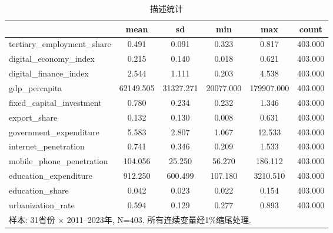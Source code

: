 \begin{table}[htbp]\centering
\def\sym#1{\ifmmode^{#1}\else\(^{#1}\)\fi}
\caption{描述统计}
\begin{tabular}{l*{1}{ccccc}}
\hline\hline
            &        mean&          sd&         min&         max&       count\\
\hline
tertiary\_employment\_share&       0.491&       0.091&       0.323&       0.817&     403.000\\
digital\_economy\_index&       0.215&       0.140&       0.018&       0.621&     403.000\\
digital\_finance\_index&       2.544&       1.111&       0.203&       4.538&     403.000\\
gdp\_percapita&   62149.505&   31327.271&   20077.000&  179907.000&     403.000\\
fixed\_capital\_investment&       0.780&       0.234&       0.232&       1.346&     403.000\\
export\_share&       0.132&       0.130&       0.008&       0.631&     403.000\\
government\_expenditure&       5.583&       2.807&       1.067&      12.533&     403.000\\
internet\_penetration&       0.741&       0.346&       0.209&       1.533&     403.000\\
mobile\_phone\_penetration&     104.056&      25.250&      56.270&     186.112&     403.000\\
education\_expenditure&     912.250&     600.499&     107.180&    3210.510&     403.000\\
education\_share&       0.042&       0.023&       0.022&       0.154&     403.000\\
urbanization\_rate&       0.594&       0.129&       0.277&       0.893&     403.000\\
\hline\hline
\multicolumn{6}{l}{\footnotesize 样本: 31省份 × 2011–2023年, N=403. 所有连续变量经1\%缩尾处理.}\\
\end{tabular}
\end{table}
